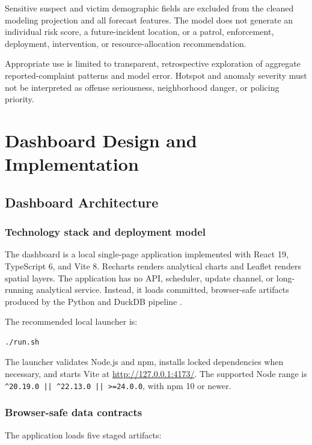 \documentclass[11pt,oneside]{report}
\begin{document}
Sensitive suspect and victim demographic fields are excluded from the cleaned
modeling projection and all forecast features. The model does not generate an
individual risk score, a future-incident location, or a patrol, enforcement,
deployment, intervention, or resource-allocation recommendation.

Appropriate use is limited to transparent, retrospective exploration of
aggregate reported-complaint patterns and model error. Hotspot and anomaly
severity must not be interpreted as offense seriousness, neighborhood danger,
or policing priority.

\part{Dashboard Design and Implementation}

\chapter{Dashboard Architecture}

\section{Technology stack and deployment model}

The dashboard is a local single-page application implemented with React 19,
TypeScript 6, and Vite 8. Recharts renders analytical charts and Leaflet renders
spatial layers. The application has no API, scheduler, update channel, or
long-running analytical service. Instead, it loads committed, browser-safe
artifacts produced by the Python and DuckDB pipeline \cite{dashboardreadme}.

The recommended local launcher is:

\begin{verbatim}
./run.sh
\end{verbatim}

The launcher validates Node.js and npm, installs locked dependencies when
necessary, and starts Vite at \url{http://127.0.0.1:4173/}. The supported Node
range is \texttt{\string^20.19.0 || \string^22.13.0 || >=24.0.0}, with npm 10 or newer.

\section{Browser-safe data contracts}

The application loads five staged artifacts:
\end{document}

